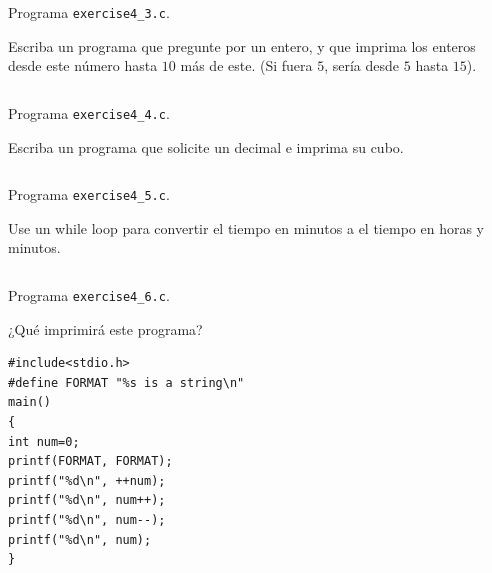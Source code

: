 \documentclass[spanish,addpoints,answers,a4paper]{exam}
\begin{document}
\begin{questions}
\begin{solution}
	
\begin{listing}[H]
	\footnotesize
	\inputminted{c}{exercise4_3.c}
	\caption{Programa \texttt{exercise4\_3.c}.}
	\label{lst:4.3}
\end{listing}
\end{solution}

\question Escriba un programa que pregunte por un entero, y que imprima los enteros desde este número hasta $10$ más de este. (Si fuera $5$, sería desde $5$ hasta $15$).

\begin{solution}

\begin{listing}[H]
	\footnotesize
	\inputminted{c}{exercise4_4.c}
	\caption{Programa \texttt{exercise4\_4.c}.}
	\label{lst:4.4}
\end{listing}
\end{solution}

\question Escriba un programa que solicite un decimal e imprima su cubo.

\begin{solution}
	
\begin{listing}[H]
	\footnotesize
	\inputminted{c}{exercise4_5.c}
	\caption{Programa \texttt{exercise4\_5.c}.}
	\label{lst:4.5}
\end{listing}
\end{solution}

\question Use un while loop para convertir el tiempo en minutos a el tiempo en horas y minutos.

\begin{solution}
	
\begin{listing}[H]
	\footnotesize
	\inputminted{c}{exercise4_6.c}
	\caption{Programa \texttt{exercise4\_6.c}.}
	\label{lst:4.6}
\end{listing}
\end{solution}

\question ¿Qué imprimirá este programa?

\begin{verbatim}
#include<stdio.h>
#define FORMAT "%s is a string\n"
main()
{
int num=0;
printf(FORMAT, FORMAT);
printf("%d\n", ++num);
printf("%d\n", num++);
printf("%d\n", num--);
printf("%d\n", num);
}
\end{verbatim}

\begin{solution}
	

\end{solution}
\end{questions}
\end{document}
